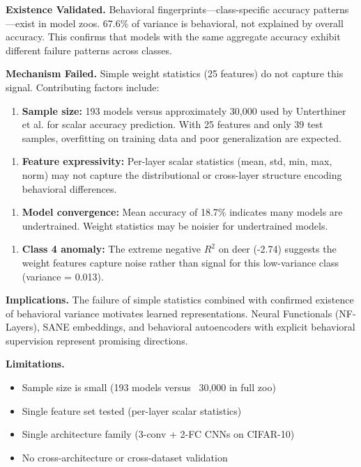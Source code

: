 
\textbf{Existence Validated.} Behavioral fingerprints---class-specific accuracy patterns---exist in model zoos. 67.6\% of variance is behavioral, not explained by overall accuracy. This confirms that models with the same aggregate accuracy exhibit different failure patterns across classes.

\textbf{Mechanism Failed.} Simple weight statistics (25 features) do not capture this signal. Contributing factors include:

\begin{enumerate}
\item \textbf{Sample size:} 193 models versus approximately 30,000 used by Unterthiner et al. for scalar accuracy prediction. With 25 features and only 39 test samples, overfitting on training data and poor generalization are expected.
\end{enumerate}

\begin{enumerate}
\item \textbf{Feature expressivity:} Per-layer scalar statistics (mean, std, min, max, norm) may not capture the distributional or cross-layer structure encoding behavioral differences.
\end{enumerate}

\begin{enumerate}
\item \textbf{Model convergence:} Mean accuracy of 18.7\% indicates many models are undertrained. Weight statistics may be noisier for undertrained models.
\end{enumerate}

\begin{enumerate}
\item \textbf{Class 4 anomaly:} The extreme negative $R^2$ on deer (-2.74) suggests the weight features capture noise rather than signal for this low-variance class (variance = 0.013).
\end{enumerate}

\textbf{Implications.} The failure of simple statistics combined with confirmed existence of behavioral variance motivates learned representations. Neural Functionals (NF-Layers), SANE embeddings, and behavioral autoencoders with explicit behavioral supervision represent promising directions.

\textbf{Limitations.}
\begin{itemize}
\item Sample size is small (193 models versus ~30,000 in full zoo)
\item Single feature set tested (per-layer scalar statistics)
\item Single architecture family (3-conv + 2-FC CNNs on CIFAR-10)
\item No cross-architecture or cross-dataset validation
\end{itemize}
